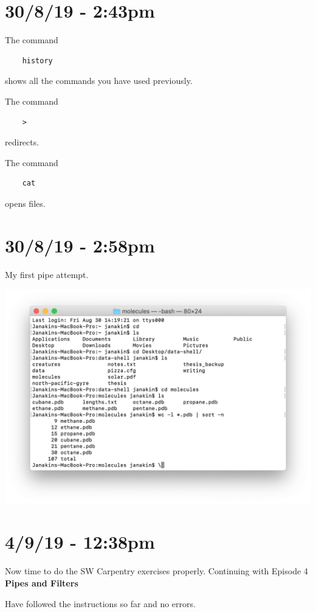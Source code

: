 \documentclass{article}
\begin{document}
\section*{30/8/19 - 2:43pm}

The command \begin{verbatim}
    history
\end{verbatim}
shows all the commands you have used previously.

The command \begin{verbatim}
    >
\end{verbatim}
redirects.

The command \begin{verbatim}
    cat
\end{verbatim}
opens files.

\section*{30/8/19 - 2:58pm}

My first pipe attempt.

\includegraphics[width=\textwidth]{figb.png}

\section*{4/9/19 - 12:38pm}

Now time to do the SW Carpentry exercises properly. Continuing with Episode 4 \textbf{Pipes and Filters}

Have followed the instructions so far and no errors.
\end{document}
